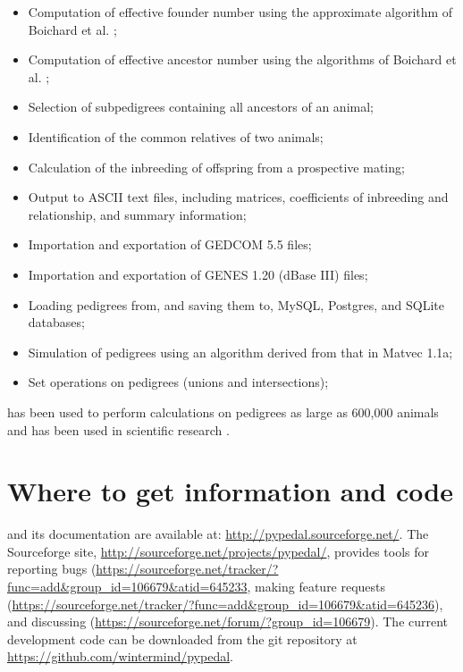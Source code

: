 \begin{itemize}
\item Computation of effective founder number using the approximate algorithm of Boichard et al. \citeyear{ref352};
\item Computation of effective ancestor number using the algorithms of Boichard et al. \citeyear{ref352};
\item Selection of subpedigrees containing all ancestors of an animal;
\item Identification of the common relatives of two animals;
\item Calculation of the inbreeding of offspring from a prospective mating;
\item Output to ASCII text files, including matrices, coefficients of inbreeding and relationship, and summary information;
\item Importation and exportation of GEDCOM 5.5 files;
\item Importation and exportation of GENES 1.20 (dBase III) files;
\item Loading pedigrees from, and saving them to, MySQL, Postgres, and SQLite databases;
\item Simulation of pedigrees using an algorithm derived from that in Matvec 1.1a;
\item Set operations on pedigrees (unions and intersections);
\end{itemize}
\PyPedal{} has been used to perform calculations on pedigrees as large as 600,000 animals and has been used in scientific research \cite{Cole2004a,Cole2007a}.

\section{Where to get information and code}
\PyPedal{} and its documentation are available at: \url{http://pypedal.sourceforge.net/}.  The Sourceforge site, \url{http://sourceforge.net/projects/pypedal/}, provides tools for reporting bugs (\url{https://sourceforge.net/tracker/?func=add&group_id=106679&atid=645233}, making feature requests (\url{https://sourceforge.net/tracker/?func=add&group_id=106679&atid=645236}), and discussing \PyPedal{} (\url{https://sourceforge.net/forum/?group_id=106679}). The current development code can be downloaded from the \PyPedal{} git repository at \url{https://github.com/wintermind/pypedal}.

